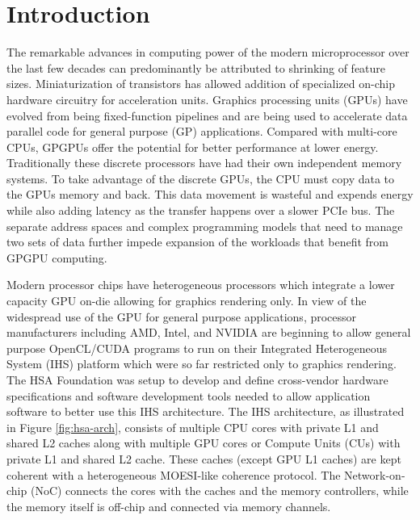 \section{Introduction}\label{introduction}



\par The remarkable advances in computing power of the modern microprocessor over the last few decades can predominantly be attributed to shrinking of feature sizes. Miniaturization of transistors has allowed addition of specialized on-chip hardware circuitry for acceleration units. 
Graphics processing units (GPUs) have evolved from being fixed-function pipelines and are being used to accelerate data parallel code for general purpose (GP) applications. Compared with multi-core CPUs, GPGPUs offer the potential for better performance at lower energy. Traditionally these discrete processors have had their own independent memory systems. To take advantage of the discrete GPUs, the CPU must copy data to the GPUs memory and back. This data movement is wasteful and expends energy while also adding latency as the transfer happens over a slower PCIe bus. The separate address spaces and complex programming models that need to manage two sets of data further impede expansion of the workloads that benefit from GPGPU computing. 

\par Modern processor chips have heterogeneous processors which integrate a lower capacity GPU on-die allowing for graphics rendering only. In view of the widespread use of the GPU for general purpose applications, processor manufacturers including AMD\cite{amd-apu}, Intel\cite{inteliris}, and NVIDIA\cite{denver} are beginning to allow general purpose OpenCL\cite{opencl}/CUDA\cite{cuda} programs to run on their Integrated Heterogeneous System (IHS) platform which were so far restricted only to graphics rendering. The HSA Foundation \cite{hsafoundation} was setup to develop and define cross-vendor hardware specifications and software development tools needed to allow application software to better use this IHS architecture. 
The IHS architecture, as illustrated in Figure \ref{fig:hsa-arch}, consists of multiple CPU cores with private L1 and shared L2 caches along with multiple GPU cores or Compute Units (CUs) with private L1 and shared L2 cache. These caches (except GPU L1 caches) are kept coherent with a heterogeneous MOESI-like coherence protocol. The Network-on-chip (NoC) connects the cores with the caches and the memory controllers, while the memory itself is off-chip and connected via memory channels.

